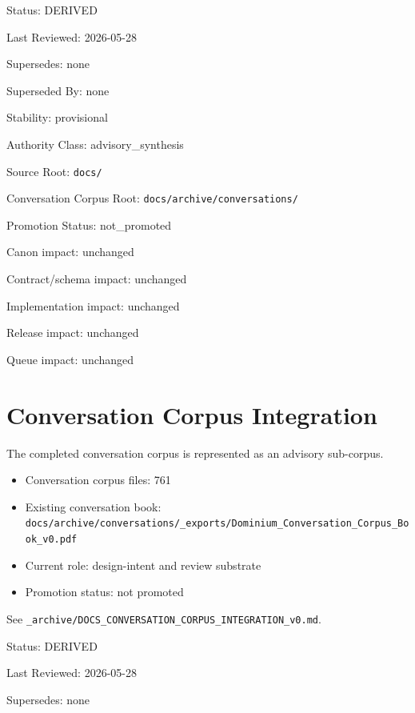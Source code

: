 \documentclass[10.5pt,a4paper]{book}
\begin{document}
Status: DERIVED

Last Reviewed: 2026-\allowbreak{}05-\allowbreak{}28

Supersedes: none

Superseded By: none

Stability: provisional

Authority Class: advisory\_\allowbreak{}synthesis

Source Root: \texttt{docs/\allowbreak{}}

Conversation Corpus Root: \texttt{docs/\allowbreak{}archive/\allowbreak{}conversations/\allowbreak{}}

Promotion Status: not\_\allowbreak{}promoted

Canon impact: unchanged

Contract/\allowbreak{}schema impact: unchanged

Implementation impact: unchanged

Release impact: unchanged

Queue impact: unchanged


\part{Conversation Corpus Integration}

The completed conversation corpus is represented as an advisory sub-\allowbreak{}corpus.\allowbreak{}


\begin{itemize}
\item Conversation corpus files: 761
\item Existing conversation book: \texttt{docs/\allowbreak{}archive/\allowbreak{}conversations/\allowbreak{}\_\allowbreak{}exports/\allowbreak{}Dominium\_\allowbreak{}Conversation\_\allowbreak{}Corpus\_\allowbreak{}Book\_\allowbreak{}v0.\allowbreak{}pdf}
\item Current role: design-\allowbreak{}intent and review substrate
\item Promotion status: not promoted
\end{itemize}

See \texttt{\_\allowbreak{}archive/\allowbreak{}DOCS\_\allowbreak{}CONVERSATION\_\allowbreak{}CORPUS\_\allowbreak{}INTEGRATION\_\allowbreak{}v0.\allowbreak{}md}.\allowbreak{}



Status: DERIVED

Last Reviewed: 2026-\allowbreak{}05-\allowbreak{}28

Supersedes: none
\end{document}
